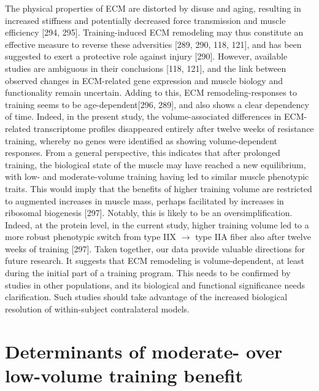 \documentclass[twoside,10pt]{gihclass} %
\begin{document}
The physical properties of ECM are distorted by disuse and aging, resulting in increased stiffness and potentially decreased force transmission and muscle efficiency {[}294, 295{]}.
Training-induced ECM remodeling may thus constitute an effective measure to reverse these adversities {[}289, 290, 118, 121{]},
and has been suggested to exert a protective role against injury {[}290{]}.
However, available studies are ambiguous in their conclusions {[}118, 121{]},
and the link between observed changes in ECM-related gene expression and muscle biology and functionality remain uncertain. Adding to this, ECM remodeling-responses to training seems to be age-dependent{[}296, 289{]},
and also shows a clear dependency of time. Indeed, in the present study, the volume-associated differences in ECM-related transcriptome profiles disappeared entirely after twelve weeks of resistance training, whereby no genes were identified as showing volume-dependent responses.
From a general perspective, this indicates that after prolonged training, the biological state of the muscle may have reached a new equilibrium, with low- and moderate-volume training having led to similar muscle phenotypic traits.
This would imply that the benefits of higher training volume are restricted to augmented increases in muscle mass, perhaps facilitated by increases in ribosomal biogenesis {[}297{]}.
Notably, this is likely to be an oversimplification. Indeed, at the protein level, in the current study, higher training volume led to a more robust phenotypic switch from type IIX \(\rightarrow\) type IIA fiber also after twelve weeks of training {[}297{]}. Taken together, our data provide valuable directions for future research. It suggests that ECM remodeling is volume-dependent, at least during the initial part of a training program. This needs to be confirmed by studies in other populations, and its biological and functional significance needs clarification. Such studies should take advantage of the increased biological resolution of within-subject contralateral models.

\hypertarget{determinants-of-moderate--over-low-volume-training-benefit}{%
\section{Determinants of moderate- over low-volume training benefit}\label{determinants-of-moderate--over-low-volume-training-benefit}}
\end{document}
